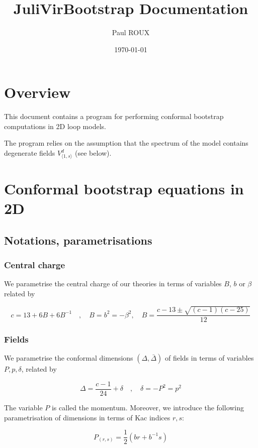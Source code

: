 \documentclass[a4paper]{article}
\author{Paul ROUX}
\date{\today}
\title{JuliVirBootstrap Documentation}
\numberwithin{equation}{section}
\begin{document}
\maketitle
\setcounter{tocdepth}{3}
\tableofcontents

\section{Overview}
\label{sec:org7d1d660}

This document contains a program for performing conformal bootstrap computations in 2D loop models.

The program relies on the assumption that the spectrum of the model contains degenerate fields \(V^d_{\langle1,s\rangle}\) (see below).
\section{Conformal bootstrap equations in 2D}
\label{sec:org6f59526}

\subsection{Notations, parametrisations}
\label{sec:org1e14d99}

\subsubsection*{Central charge}
\label{sec:org009c0e4}

We parametrise the central charge of our theories in terms of variables \(B\), \(b\) or \(\beta\) related by

\[c = 13 + 6B + 6 B^{-1} \quad , \quad B = b^2 = -\beta^2, \quad B = \frac{c-13 \pm \sqrt{(c-1)(c-25)}}{12}\]
\subsubsection*{Fields}
\label{sec:orga0a500d}

We parametrise the conformal dimensions \((\Delta, \bar\Delta)\) of fields in terms of variables \(P, p, \delta\), related by

\[
\Delta = \frac{c-1}{24} + \delta  \quad , \quad \delta = -P^2 = p^2
\]

The variable \(P\) is called the momentum. Moreover, we introduce the following parametrisation of dimensions in terms of Kac indices \(r, s\):

\[P_{(r,s)}=\frac{1}{2}(b r + b^{-1}s)\]
\end{document}
